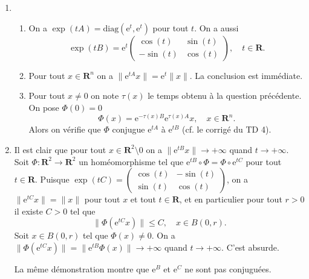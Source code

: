 \documentclass[a4paper,12pt,openany]{article}
\theoremstyle{plain}
\theoremstyle{definition}
\newcommand{\e}{\mathrm{e}}
\newcommand{\R}{\mathbf{R}}
\begin{document}
\begin{enumerate}
\begin{enumerate}
\end{enumerate}
\item 
\begin{enumerate}
\item On a $\exp(tA) = \mathrm{diag}(\e^{t}, \e^{t})$ pour tout $t$. On a aussi
$$\exp(tB) = \e^{t} \begin{pmatrix} \cos(t) & \sin(t) \\ -\sin(t) & \cos(t) \end{pmatrix}, \quad t \in \R.$$
\item Pour tout $x \in \R^n$ on a $\|\e^{tA}x\| = \e^{t} \|x\|$. La conclusion est imm\'ediate.
\item Pour tout $x \neq 0$ on note $\tau(x)$ le temps obtenu \`a la question pr\'ec\'edente. On pose $\Phi(0)=0$
$$
\Phi(x) = \e^{-\tau(x)B} \e^{\tau(x)A} x, \quad x \in \R^n.
$$
Alors on v\'erifie que $\Phi$ conjugue $\e^{tA}$ \`a $\e^{tB}$ (cf. le corrig\'e du TD 4).
\end{enumerate}

\item Il est clair que pour tout $x \in \R^2 \setminus 0$ on a $\|\e^{tB}x\| \to +\infty$ quand $t \to +\infty$. Soit $\Phi : \R^2 \to \R^2$ un hom\'eomorphisme tel que $\e^{tB} \circ \Phi = \Phi \circ \e^{tC}$ pour tout $t \in \R$. Puisque $\exp(tC) = \begin{pmatrix} \cos(t) & -\sin(t) \\ \sin(t) & \cos(t) \end{pmatrix}$, on a $\|\e^{tC}x\| = \|x\|$ pour tout $x$ et tout $t \in \R$, et en particulier pour tout $r>0$ il existe $C>0$ tel que
$$
\|\Phi(\e^{tC}x)\|\leq C, \quad x \in B(0,r).
$$
Soit $x \in B(0,r)$ tel que $\Phi(x) \neq 0$. On a $\|\Phi(\e^{tC}x)\| = \|\e^{tB} \Phi(x)\| \to + \infty$ quand $t \to +\infty$. C'est absurde. 

La m\^eme d\'emonstration montre que $\e^{B}$ et $\e^C$ ne sont pas conjugu\'ees.

\end{enumerate}
\vspace{0.6cm}
\newpage

\end{document}
